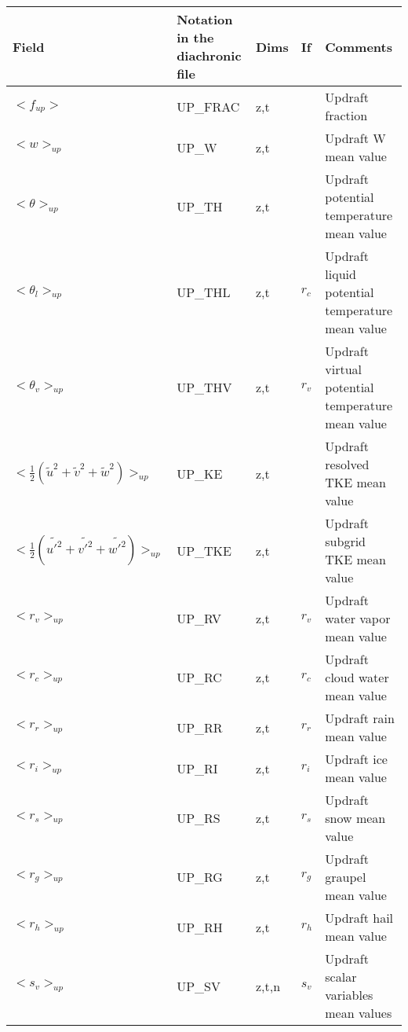 \begin{longtable}[c]{|p{}|p{}|p{}|p{}|p{}|}
\hline
Field & Notation in the diachronic file & Dims & If  & Comments \\
\hline \hline
\endhead
$<f_{up}>$                                    & UP\_FRAC  & z,t   &       & Updraft fraction \\\hline
$<w>_{up}$                                    & UP\_W     & z,t   &       & Updraft W mean value \\\hline
$<\theta>_{up}$                               & UP\_TH    & z,t   &       & Updraft potential temperature mean value \\\hline
$<\theta_l>_{up}$                             & UP\_THL   & z,t   & $r_c$ & Updraft liquid potential temperature mean value \\\hline
$<\theta_v>_{up}$                             & UP\_THV   & z,t   & $r_v$ & Updraft virtual potential temperature mean value \\\hline
$<\frac{1}{2}(\tilde{u}^2+\tilde{v}^2+\tilde{w}^2)>_{up}$ & UP\_KE & z,t & & Updraft resolved TKE mean value \\\hline
$<\frac{1}{2}(\tilde{u'^2}+\tilde{v'^2}+\tilde{w'^2})>_{up}$ & UP\_TKE & z,t & & Updraft subgrid TKE mean value \\\hline
$<r_v>_{up}$                                  & UP\_RV    & z,t   & $r_v$ & Updraft water vapor mean value \\\hline
$<r_c>_{up}$                                  & UP\_RC    & z,t   & $r_c$ & Updraft cloud water mean value \\\hline
$<r_r>_{up}$                                  & UP\_RR    & z,t   & $r_r$ & Updraft rain mean value \\\hline
$<r_i>_{up}$                                  & UP\_RI    & z,t   & $r_i$ & Updraft ice mean value \\\hline
$<r_s>_{up}$                                  & UP\_RS    & z,t   & $r_s$ & Updraft snow mean value \\\hline
$<r_g>_{up}$                                  & UP\_RG    & z,t   & $r_g$ & Updraft graupel mean value \\\hline
$<r_h>_{up}$                                  & UP\_RH    & z,t   & $r_h$ & Updraft hail mean value \\\hline
$<s_v>_{up}$                                  & UP\_SV    & z,t,n & $s_v$ & Updraft scalar variables mean values \\\hline

\end{longtable}
